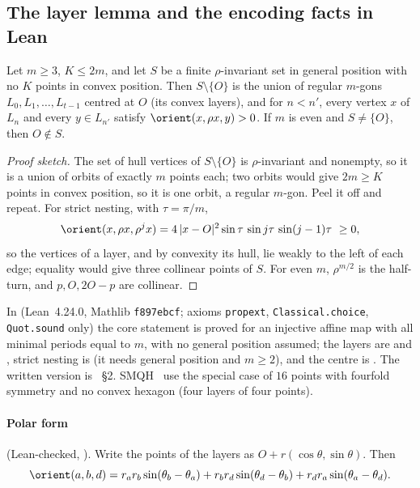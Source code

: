 \subsection{The layer lemma and the encoding facts in Lean}\label{k8:sec:lean}

\begin{lemma}\label{k8:layer}
Let $m\ge3$, $K\le2m$, and let $S$ be a finite $\rho$-invariant set in general position with no $K$ points in
convex position. Then $S\setminus\{O\}$ is the union of regular $m$-gons $L_0,L_1,\dots,L_{t-1}$ centred at $O$ (its
convex layers), and for $n<n'$, every vertex $x$ of $L_n$ and every $y\in L_{n'}$ satisfy $\orient(x,\rho x,y)>0$. If $m$
is even and $S\ne\{O\}$, then $O\notin S$.
\end{lemma}

\begin{proof}[Proof sketch]
The set of hull vertices of $S\setminus\{O\}$ is $\rho$-invariant and nonempty, so it is a union of orbits of exactly
$m$ points each; two orbits would give $2m\ge K$ points in convex position, so it is one orbit, a regular $m$-gon. Peel
it off and repeat. For strict nesting, with $\tau=\pi/m$,
\[
\orient(x,\rho x,\rho^j x)=4\,|x-O|^2\sin\tau\,\sin j\tau\,\sin(j-1)\tau\ \ge0,
\]
so the vertices of a layer, and by convexity its hull, lie weakly to the left of each edge; equality would give three
collinear points of $S$. For even $m$, $\rho^{m/2}$ is the half-turn, and $p,O,2O-p$ are collinear.
\end{proof}

In  (Lean~4.24.0, Mathlib \texttt{f897ebcf}; axioms \texttt{propext},
\texttt{Classical.choice}, \texttt{Quot.sound} only) the core statement  is proved for an
injective affine map with all minimal periods equal to $m$, with no general position assumed; the layers are
 and , strict nesting is  (it needs general position and
$m\ge2$), and the centre is . The written version is ~\S2.
SMQH~\cite[\S3.2]{SMQH25} use the special case of $16$ points with fourfold symmetry and no convex hexagon (four layers
of four points).

\paragraph{Polar form} (Lean-checked, ). Write the points of the layers as $O+r(\cos\theta,\sin\theta)$. Then
\[
\orient(a,b,d)=r_ar_b\sin(\theta_b-\theta_a)+r_br_d\sin(\theta_d-\theta_b)+r_dr_a\sin(\theta_a-\theta_d).
\]

